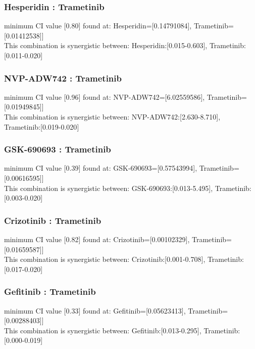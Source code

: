 \documentclass[11pt]{article}
\begin{document}
    \subsubsection{Hesperidin : Trametinib}\label{hesperidin-trametinib}

minimum CI value {[}0.80{]} found at: Hesperidin={[}0.14791084{]},
Trametinib={[}0.01412538{]}{]}\\
This combination is synergistic between: Hesperidin:{[}0.015-0.603{]},
Trametinib:{[}0.011-0.020{]}

\subsubsection{NVP-ADW742 : Trametinib}\label{nvp-adw742-trametinib}

minimum CI value {[}0.96{]} found at: NVP-ADW742={[}6.02559586{]},
Trametinib={[}0.01949845{]}{]}\\
This combination is synergistic between: NVP-ADW742:{[}2.630-8.710{]},
Trametinib:{[}0.019-0.020{]}

\subsubsection{GSK-690693 : Trametinib}\label{gsk-690693-trametinib}

minimum CI value {[}0.39{]} found at: GSK-690693={[}0.57543994{]},
Trametinib={[}0.00616595{]}{]}\\
This combination is synergistic between: GSK-690693:{[}0.013-5.495{]},
Trametinib:{[}0.003-0.020{]}

\subsubsection{Crizotinib : Trametinib}\label{crizotinib-trametinib}

minimum CI value {[}0.82{]} found at: Crizotinib={[}0.00102329{]},
Trametinib={[}0.01659587{]}{]}\\
This combination is synergistic between: Crizotinib:{[}0.001-0.708{]},
Trametinib:{[}0.017-0.020{]}

\subsubsection{Gefitinib : Trametinib}\label{gefitinib-trametinib}

minimum CI value {[}0.33{]} found at: Gefitinib={[}0.05623413{]},
Trametinib={[}0.00288403{]}{]}\\
This combination is synergistic between: Gefitinib:{[}0.013-0.295{]},
Trametinib:{[}0.000-0.019{]}
\end{document}
